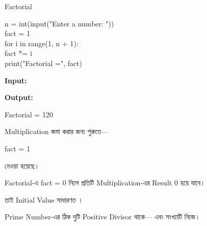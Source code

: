 \begin{codeoutputbox}{Factorial}

\noindent
\begin{minipage}[t]{0.53\linewidth}
\codeheading

\begin{english}
\ttfamily
n = int(input("Enter a number: "))\\
fact = 1\\[0.5mm]
for i in range(1, n + 1):\\
\hspace*{4mm}fact *= i\\[0.5mm]
print("Factorial =", fact)
\end{english}

\end{minipage}
\hfill
\begin{minipage}[t]{0.43\linewidth}
\outputheading

\textbf{Input:}
\textenglish{}

\medskip

\textbf{Output:}

\textenglish{\ttfamily Factorial = 120}

\medskip

Multiplication জমা করার জন্য শুরুতে—

\begin{center}
\textenglish{\ttfamily fact = 1}
\end{center}

নেওয়া হয়েছে।

\end{minipage}

\end{codeoutputbox}

\begin{rememberbox}

Factorial-এ
\textenglish{\ttfamily fact = 0}
নিলে প্রতিটি Multiplication-এর Result 0 হয়ে যাবে।

তাই Initial Value সাধারণত
\textenglish{}।

\end{rememberbox}



Prime Number-এর ঠিক দুটি Positive Divisor থাকে—
\textenglish{}
এবং সংখ্যাটি নিজে।

